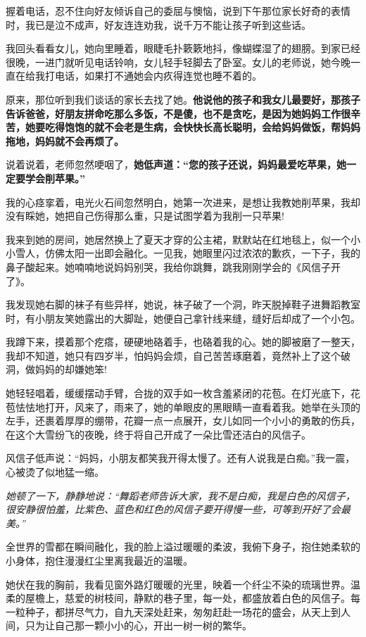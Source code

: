 \documentclass[UTF8,a4paper,8pt]{ctexart}
\begin{document}
 握着电话，忍不住向好友倾诉自己的委屈与懊恼，说到下午那位家长好奇的表情时，我已是泣不成声，好友连连劝我，说千万不能让孩子听到这些话。
 
 我回头看看女儿，她向里睡着，眼睫毛扑簌簌地抖，像蝴蝶湿了的翅膀。到家已经很晚，一进门就听见电话铃响，女儿轻手轻脚去了卧室。女儿的老师说，她今晚一直在给我打电话，如果打不通她会内疚得连觉也睡不着的。
 
 原来，那位听到我们谈话的家长去找了她。\textbf{他说他的孩子和我女儿最要好，那孩子告诉爸爸，好朋友拼命吃那么多饭，不是傻，也不是贪吃，是因为她妈妈工作很辛苦，她要吃得饱饱的就不会老是生病，会快快长高长聪明，会给妈妈做饭，帮妈妈拖地，妈妈就不会再烦了。}
 
 说着说着，老师忽然哽咽了，\textbf{她低声道：“您的孩子还说，妈妈最爱吃苹果，她一定要学会削苹果。”}
 
 我的心痉挛着，电光火石间忽然明白，她第一次进来，是想让我教她削苹果，我却没有睬她，她把自己伤得那么重，只是试图学着为我削一只苹果!
 
 我来到她的房间，她居然换上了夏天才穿的公主裙，默默站在红地毯上，似一个小小雪人，仿佛太阳一出即会融化。一见我，她眼里闪过浓浓的歉疚，一下子，我的鼻子酸起来。她喃喃地说妈妈别哭，我给你跳舞，跳我刚刚学会的《风信子开了》。
 
 我发现她右脚的袜子有些异样，她说，袜子破了一个洞，昨天脱掉鞋子进舞蹈教室时，有小朋友笑她露出的大脚趾，她便自己拿针线来缝，缝好后却成了一个小包。
 
 我蹲下来，摸着那个疙瘩，硬硬地硌着手，也硌着我的心。她的脚被磨了一整天，我却不知道，她只有四岁半，怕妈妈会烦，自己苦苦琢磨着，竟然补上了这个破洞，做妈妈的却嫌她笨!
 
 她轻轻唱着，缓缓摆动手臂，合拢的双手如一枚含羞紧闭的花苞。在灯光底下，花苞怯怯地打开，风来了，雨来了，她的单眼皮的黑眼睛一直看着我。她举在头顶的左手，还裹着厚厚的绷带，花瓣一点一点展开，女儿如同一个小小的勇敢的伤兵，在这个大雪纷飞的夜晚，终于将自己开成了一朵比雪还洁白的风信子。
 
 风信子低声说：“妈妈，小朋友都笑我开得太慢了。还有人说我是白痴。”我一震，心被烫了似地猛一缩。
 
 \textit{她顿了一下，静静地说：“舞蹈老师告诉大家，我不是白痴，我是白色的风信子，很安静很怕羞，比紫色、蓝色和红色的风信子要开得慢一些，可等到开好了会最美。”}
 
 全世界的雪都在瞬间融化，我的脸上溢过暖暖的柔波，我俯下身子，抱住她柔软的小身体，抱住漫漫红尘里离我最近的温暖。
 
 她伏在我的胸前，我看见窗外路灯暖暖的光里，映着一个纤尘不染的琉璃世界。温柔的屋檐上，慈爱的树枝间，静默的巷子里，每一处，都盛放着白色的风信子。每一粒种子，都拼尽气力，自九天深处赶来，匆匆赶赴一场花的盛会，从天上到人间，只为让自己那一颗小小的心，开出一树一树的繁华。
 
\end{document}
